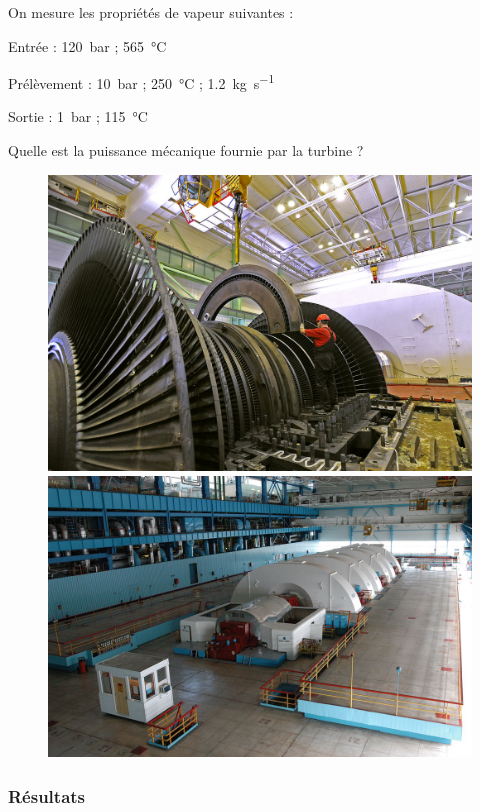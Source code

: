 	On mesure les propriétés de vapeur suivantes :
	
	\begin{description}
		\item Entrée : 		\SI{120}{\bar} ; 	\SI{565}{\degreeCelsius}
		\item Prélèvement : 	\SI{10}{\bar} ; 	\SI{250}{\degreeCelsius} ;	\SI{1,2}{\kilogram\per\second}
		\item Sortie : 		\SI{1}{\bar} ;		\SI{115}{\degreeCelsius}
	\end{description}

	Quelle est la puissance mécanique fournie par la turbine ?

	\begin{figure}
		\begin{center}
			\includegraphics[height=0.33\textwidth]{images/exercice_turbine_centrale2.jpg}
			\includegraphics[height=0.33\textwidth]{images/exercice_turbine_centrale1.jpg}
		\end{center}
		\label{fig_centrale_balakovo}
	\end{figure}

\exercisesolutionpage
\subsubsection*{Résultats}
	\linktosolutionsblurb

